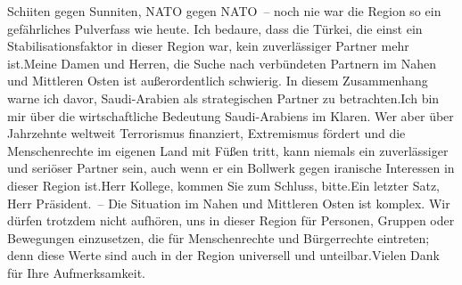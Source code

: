 \documentclass{article}
\begin{document}
Schiiten gegen Sunniten, NATO gegen NATO – noch nie war die Region so ein gefährliches Pulverfass wie heute. Ich bedaure, dass die Türkei, die einst ein Stabilisationsfaktor in dieser Region war, kein zuverlässiger Partner mehr ist.Meine Damen und Herren, die Suche nach verbündeten Partnern im Nahen und Mittleren Osten ist außerordentlich schwierig. In diesem Zusammenhang warne ich davor, Saudi-Arabien als strategischen Partner zu betrachten.Ich bin mir über die wirtschaftliche Bedeutung Saudi-Arabiens im Klaren. Wer aber über Jahrzehnte weltweit Terrorismus finanziert, Extremismus fördert und die Menschenrechte im eigenen Land mit Füßen tritt, kann niemals ein zuverlässiger und seriöser Partner sein, auch wenn er ein Bollwerk gegen iranische Interessen in dieser Region ist.Herr Kollege, kommen Sie zum Schluss, bitte.Ein letzter Satz, Herr Präsident. – Die Situation im Nahen und Mittleren Osten ist komplex. Wir dürfen trotzdem nicht aufhören, uns in dieser Region für Personen, Gruppen oder Bewegungen einzusetzen, die für Menschenrechte und Bürgerrechte eintreten; denn diese Werte sind auch in der Region universell und unteilbar.Vielen Dank für Ihre Aufmerksamkeit.
\end{document}
